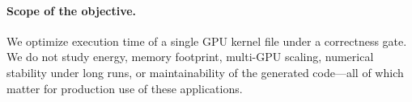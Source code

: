 \paragraph{Scope of the objective.}
We optimize execution time of a single GPU kernel file under a correctness gate. We do not study
energy, memory footprint, multi-GPU scaling, numerical stability under long runs, or maintainability of
the generated code---all of which matter for production use of these applications.
